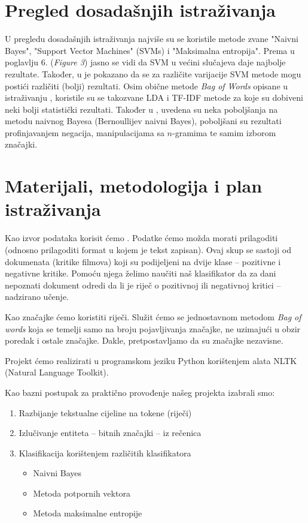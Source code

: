 \documentclass[12pt,a4paper,titlepage]{article}
\begin{document}
\section{Pregled dosadašnjih istraživanja}

U pregledu dosadašnjih istraživanja najviše su se koristile metode zvane "Naivni Bayes", "Support Vector Machines" (\textsc{SVM}s) i "Maksimalna entropija". Prema \cite{Pang:2002:TUS:1118693.1118704} u poglavlju 6. (\textit{Figure 3}) jasno se vidi da \textsc{SVM} u većini slučajeva daje najbolje rezultate. Također, u \cite{stan} je pokazano da se za različite varijacije \textsc{SVM} metode mogu postići različiti (bolji) rezultati. Osim obične metode \textit{Bag of Words} opisane u istraživanju \cite{maas-EtAl:2011:ACL-HLT2011}, koristile su se takozvane \textsc{LDA} i \textsc{TF-IDF} metode za koje su dobiveni neki bolji statistički rezultati. Također u \cite{SaLAD:LAS}, uvedena su neka poboljšanja na metodu naivnog Bayesa (Bernoullijev naivni Bayes), poboljšani su rezultati profinjavanjem negacija, manipulacijama sa $n$-gramima te samim izborom značajki.

\section{Materijali, metodologija i plan istraživanja}

Kao izvor podataka korisit ćemo \cite{dataset}. Podatke ćemo možda morati prilagoditi (odnosno prilagoditi format u kojem je tekst zapisan). Ovaj skup se sastoji od dokumenata (kritike filmova) koji su podijeljeni na dvije klase -- pozitivne i negativne kritike. Pomoću njega želimo naučiti naš klasifikator da za dani nepoznati dokument odredi da li je riječ o pozitivnoj ili negativnoj kritici -- nadzirano učenje.

Kao značajke ćemo koristiti riječi. Služit ćemo se jednostavnom metodom \textit{Bag of words} koja se temelji samo na broju pojavljivanja značajke, ne uzimajući u obzir poredak i ostale značajke. Dakle, pretpostavljamo da su značajke nezavisne.

Projekt ćemo realizirati u programskom jeziku Python korištenjem alata NLTK (Natural Language Toolkit). 

Kao bazni postupak za praktično provođenje našeg projekta izabrali smo:

\begin{enumerate}
  \item Razbijanje tekstualne cijeline na tokene (riječi)
  \item Izlučivanje entiteta -- bitnih značajki -- iz rečenica
  \item Klasifikacija korištenjem različitih klasifikatora
  \begin{itemize}
    \item Naivni Bayes
    \item Metoda potpornih vektora
    \item Metoda maksimalne entropije
  \end{itemize}
\end{enumerate}
\end{document}
